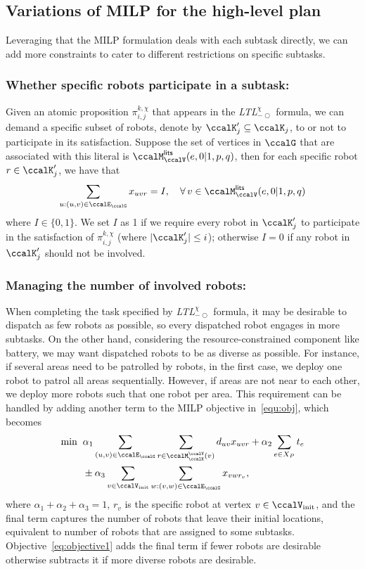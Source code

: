 \documentclass[Afour,sageh,times]{sagej}
\newcommand{\ltlx}{ {\it LTL}$_{-\bigcirc}^\chi$ }
\renewcommand{\ap}[3]{\mathcal{\pi}_{{#1},{#2}}^{#3}}
\begin{document}
{{\subsection{Variations of MILP for the high-level plan}\label{sec:extension_milp}
Leveraging that the MILP formulation deals with each subtask directly, we can add more constraints to cater to different restrictions on specific subtasks.
\subsubsection{Whether specific robots participate in a subtask:}
Given an atomic proposition $\ap{i}{j}{k,\chi}$ that appears in the \ltlx formula, we can demand  a specific subset of robots, denote by  ${\ccalK}'_j \subseteq \ccalK_j$,  to or not to participate in its satisfaction. Suppose the set of vertices  in $\ccalG$ that are associated with this literal is $\ccalM_{\ccalV}^\mathsf{lits} (e, 0|1, p, q)$,  then for each specific robot $r \in \ccalK'_j$, we have that
\begin{align}
  \sum_{u:(u,v) \in \ccalE_\ccalG} x_{uvr} = I, \quad  \forall \, v \in \ccalM_{\ccalV}^\mathsf{lits} (e, 0|1, p, q)
\end{align}
where $I\in \{0, 1\}$. We set $I$ as 1 if we require every robot in $\ccalK'_j$ to participate in the satisfaction of $\ap{i}{j}{k,\chi}$ (where $|\ccalK'_j|\leq i$); otherwise $I=0$ if any robot in $\ccalK'_j$ should not be involved. %
\subsubsection{Managing the number of involved robots:}
When completing the task specified by \ltlx formula, it may be desirable to dispatch as few robots as possible, so  every dispatched robot engages in more subtasks. On the other hand, considering the resource-constrained component like battery,  we may want dispatched robots to be  as diverse as possible. For instance, if several areas need to be patrolled by robots, in the first  case, we deploy one robot to patrol all areas sequentially. However, if areas are not near to each other, we deploy more robots such that one robot per area. This requirement can be handled by adding another term to the MILP objective in~\eqref{equ:obj}, which becomes
\begin{align}\label{eq:objective1}
  \min \; \; &  \alpha_1 \sum_{(u,v)\in \ccalE_\ccalG}  \sum_{r \in \ccalM^\ccalV_{\ccalK}(v)} d_{uv} x_{uvr} +  \alpha_2  \sum_{e\in X_P} t_e  \nonumber \\ & \pm  \alpha_3 \sum_{v\in \ccalV_{\text{init}}}   \sum_{w:(v,w)\in \ccalE_\ccalG} x_{vwr_v},
\end{align}
where $\alpha_1 + \alpha_2 + \alpha_3=1$, $r_v$ is the specific robot at vertex $v \in \ccalV_{\text{init}}$, and the final term  captures the number of robots that leave their initial locations,  equivalent to  number of robots that are assigned to some subtasks. Objective~\eqref{eq:objective1} adds the final term if fewer robots are desirable otherwise subtracts it if more diverse robots are desirable.

}}
\end{document}
